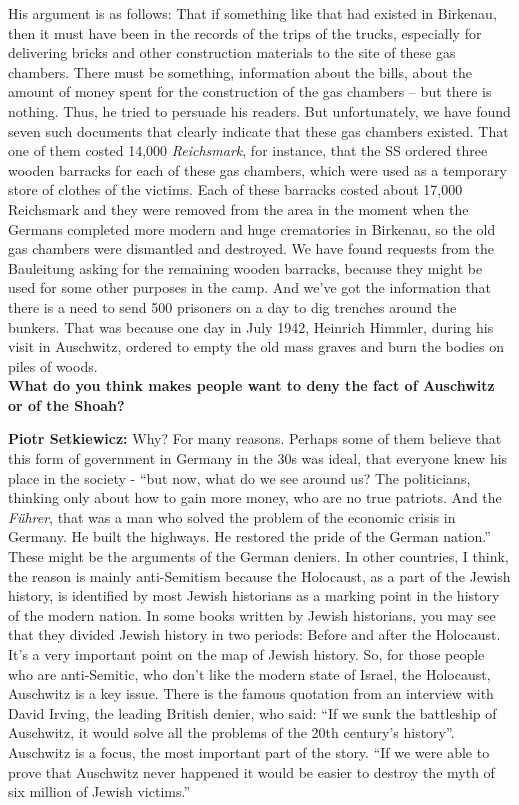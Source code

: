 His argument is as follows: That if something like that had existed in Birkenau, then it must have been in the records of the trips of the trucks, especially for delivering bricks and other construction materials to the site of these gas chambers. There must be something, information about the bills, about the amount of money spent for the construction of the gas chambers – but there is nothing. Thus, he tried to persuade his readers. But unfortunately, we have found seven such documents that clearly indicate that these gas chambers existed. That one of them costed 14,000 \textit{Reichsmark}, for instance, that the SS ordered three wooden barracks for each of these gas chambers, which were used as a temporary store of clothes of the victims. Each of these barracks costed about 17,000 Reichsmark and they were removed from the area in the moment when the Germans completed more modern and huge crematories in Birkenau, so the old gas chambers were dismantled and destroyed. We have found requests from the Bauleitung asking for the remaining wooden barracks, because they might be used for some other purposes in the camp. And we’ve got the information that there is a need to send 500 prisoners on a day to dig trenches around the bunkers. That was because one day in July 1942, Heinrich Himmler, during his visit in Auschwitz, ordered to empty the old mass graves and burn the bodies on piles of woods.\\ 

\textbf{What do you think makes people want to deny the fact of Auschwitz or of the Shoah?}

\textbf{Piotr Setkiewicz:} Why? For many reasons. Perhaps some of them believe that this form of government in Germany in the 30s was ideal, that everyone knew his place in the society - ``but now, what do we see around us? The politicians, thinking only about how to gain more money, who are no true patriots. And the \textit{Führer}, that was a man who solved the problem of the economic crisis in Germany. He built the highways. He restored the pride of the German nation.'' These might be the arguments of the German deniers. In other countries, I think, the reason is mainly anti-Semitism because the Holocaust, as a part of the Jewish history, is identified by most Jewish historians as a marking point in the history of the modern nation. In some books written by Jewish historians, you may see that they divided Jewish history in two periods: Before and after the Holocaust. It’s a very important point on the map of Jewish history. So, for those people who are anti-Semitic, who don’t like the modern state of Israel, the Holocaust, Auschwitz is a key issue. There is the famous quotation from an interview with David Irving, the leading British denier, who said: ``If we sunk the battleship of Auschwitz, it would solve all the problems of the 20th century’s history''. Auschwitz is a focus, the most important part of the story. ``If we were able to prove that Auschwitz never happened it would be easier to destroy the myth of six million of Jewish victims.''

